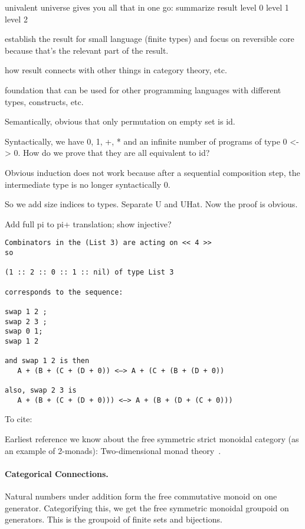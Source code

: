 
univalent universe gives you all that in one go: summarize result
level 0
level 1
level 2

establish the result for small language (finite types) and focus on reversible
core because that's the relevant part of the result.

how result connects with other things in category theory, etc.

foundation that can be used for other programming languages with different
types, constructs, etc.


Semantically, obvious that only permutation on empty set is id.

Syntactically, we have 0, 1, +, *  and an infinite number of programs of type 0
<-> 0. How do we prove that they are all equivalent to id?

Obvious induction does not work because after a sequential composition step, the
intermediate type is no longer syntactically 0.

So we add size indices to types. Separate U and UHat. Now the proof is obvious.


Add full pi to pi+ translation; show injective?

\begin{verbatim}
Combinators in the (List 3) are acting on << 4 >>
so

(1 :: 2 :: 0 :: 1 :: nil) of type List 3

corresponds to the sequence:

swap 1 2 ;
swap 2 3 ;
swap 0 1;
swap 1 2

and swap 1 2 is then
   A + (B + (C + (D + 0)) <—> A + (C + (B + (D + 0))

also, swap 2 3 is
   A + (B + (C + (D + 0))) <—> A + (B + (D + (C + 0)))
\end{verbatim}

To cite:

Earliest reference we know about the free symmetric strict monoidal category (as an example of 2-monads):
Two-dimensional monad theory~\cite{blackwellTwodimensionalMonadTheory1989}.


\paragraph*{Categorical Connections.}

Natural numbers under addition form the free commutative monoid on one generator. Categorifying this, we get the free
symmetric monoidal groupoid on generators. This is the groupoid of finite sets and bijections.


